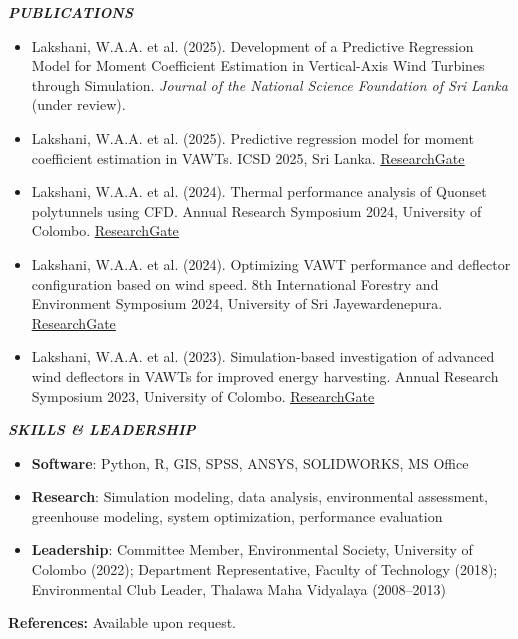 \documentclass[10pt]{article}
\newcommand{\cvsection}[1]{%
  \vspace{3pt}%
  \begin{tcolorbox}[colback=headergray,colframe=headergray,arc=7pt,
      boxrule=0pt,left=8pt,right=8pt,top=1.5pt,bottom=1.5pt]
    \itshape\bfseries\MakeUppercase{#1}%
  \end{tcolorbox}%
  \vspace{0pt}%
}
\begin{document}
\cvsection{Publications}
{\small
\begin{itemize}[itemsep=1pt]
  \item Lakshani, W.A.A. et al. (2025). Development of a Predictive Regression Model for Moment Coefficient
        Estimation in Vertical-Axis Wind Turbines through Simulation. \textit{Journal of the National Science
        Foundation of Sri Lanka} (under review).
  \item Lakshani, W.A.A. et al. (2025). Predictive regression model for moment coefficient estimation in VAWTs.
        ICSD 2025, Sri Lanka. \href{https://www.researchgate.net/}{\underline{ResearchGate}}
  \item Lakshani, W.A.A. et al. (2024). Thermal performance analysis of Quonset polytunnels using CFD.
        Annual Research Symposium 2024, University of Colombo. \href{https://www.researchgate.net/}{\underline{ResearchGate}}
  \item Lakshani, W.A.A. et al. (2024). Optimizing VAWT performance and deflector configuration based on wind speed.
        8th International Forestry and Environment Symposium 2024, University of Sri Jayewardenepura.
        \href{https://www.researchgate.net/}{\underline{ResearchGate}}
  \item Lakshani, W.A.A. et al. (2023). Simulation-based investigation of advanced wind deflectors in VAWTs for
        improved energy harvesting. Annual Research Symposium 2023, University of Colombo.
        \href{https://www.researchgate.net/}{\underline{ResearchGate}}
\end{itemize}
}

\cvsection{Skills \& Leadership}
\begin{itemize}
  \item \textbf{Software}: Python, R, GIS, SPSS, ANSYS, SOLIDWORKS, MS Office
  \item \textbf{Research}: Simulation modeling, data analysis, environmental assessment, greenhouse modeling,
        system optimization, performance evaluation
  \item \textbf{Leadership}: Committee Member, Environmental Society, University of Colombo (2022);
        Department Representative, Faculty of Technology (2018); Environmental Club Leader, Thalawa Maha Vidyalaya (2008--2013)
\end{itemize}

\vspace{4pt}
\textbf{References:} Available upon request.
\end{document}
